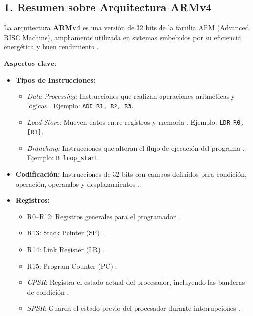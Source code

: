\documentclass[conference]{IEEEtran}
\begin{document}
\subsection*{1. Resumen sobre Arquitectura ARMv4}

La arquitectura \textbf{ARMv4} es una versión de 32 bits de la familia ARM (Advanced RISC Machine), ampliamente utilizada en sistemas embebidos por su eficiencia energética y buen rendimiento \cite{furber2000arm}.

\textbf{Aspectos clave:}
\begin{itemize}
	\item \textbf{Tipos de Instrucciones:}
	\begin{itemize}
		\item \textit{Data Processing:} Instrucciones que realizan operaciones aritméticas y lógicas \cite{meier_armv4}. Ejemplo: \texttt{ADD R1, R2, R3}.
		\item \textit{Load-Store:} Mueven datos entre registros y memoria \cite{meier_armv4}. Ejemplo: \texttt{LDR R0, [R1]}.
		\item \textit{Branching:} Instrucciones que alteran el flujo de ejecución del programa \cite{meier_armv4}. Ejemplo: \texttt{B loop\_start}.
	\end{itemize}
	
	\item \textbf{Codificación:} Instrucciones de 32 bits con campos definidos para condición, operación, operandos y desplazamientos \cite{furber2000arm}.
	
	\item \textbf{Registros:}
	\begin{itemize}
		\item R0–R12: Registros generales para el programador \cite{meier_armv4}.
		\item R13: Stack Pointer (SP) \cite{meier_armv4}.
		\item R14: Link Register (LR) \cite{meier_armv4}.
		\item R15: Program Counter (PC) \cite{meier_armv4}.
		\item \textit{CPSR}: Registra el estado actual del procesador, incluyendo las banderas de condición \cite{meier_armv4}.
		\item \textit{SPSR}: Guarda el estado previo del procesador durante interrupciones \cite{meier_armv4}.
	\end{itemize}
	
\end{itemize}
\end{document}
